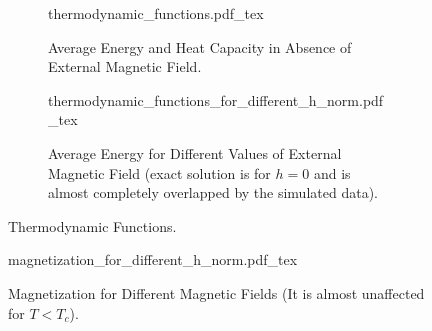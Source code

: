 \documentclass[a4paper, 11pt]{article}
\begin{document}
\begin{figure}[t]
	\begin{subfigure}{\textwidth}
		\centering
		\def\svgwidth{\columnwidth}
		{thermodynamic_functions.pdf_tex}
		\caption{Average Energy and Heat Capacity in Absence of External Magnetic Field.}
		\vspace{1.5em}
	\end{subfigure}
	\vfill
	\begin{subfigure}{\textwidth}
		\centering
		\def\svgwidth{\columnwidth}
		{thermodynamic_functions_for_different_h_norm.pdf_tex}
		\caption{\centering Average Energy for Different Values of External Magnetic Field (exact
		solution is for $h = 0$ and is almost completely overlapped by the simulated data).}
		\vspace{1em}
	\end{subfigure}
	\caption{Thermodynamic Functions.}
\end{figure}

\begin{figure}[t]
	\centering
	\def\svgwidth{\columnwidth}
	{magnetization_for_different_h_norm.pdf_tex}
	\caption{\centering Magnetization for Different Magnetic Fields (It is almost unaffected for
             $T < T_c$).}
\end{figure}
\end{document}
